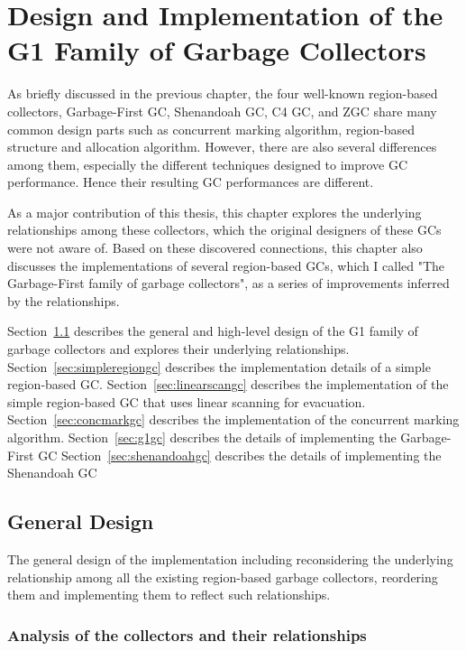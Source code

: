 \chapter{Design and Implementation of the G1 Family of Garbage Collectors}
\label{cha:implementation}

As briefly discussed in the previous chapter, the four well-known region-based collectors, Garbage-First GC, Shenandoah GC, C4 GC, and
ZGC share many common design parts such as concurrent marking algorithm, region-based
structure and allocation algorithm. However, there are also several differences
among them, especially the different techniques designed to improve GC performance.
Hence their resulting GC performances are different.

As a major contribution of this thesis, this chapter explores the underlying relationships
among these collectors, which the original designers of these GCs were not aware of.
Based on these discovered connections, this chapter also discusses the implementations
of several region-based GCs, which I called "The Garbage-First family of garbage collectors",
as a series of improvements inferred by the relationships.

Section~\ref{sec:generaldesign} describes the general and high-level design of the
G1 family of garbage collectors and explores their underlying relationships.
Section~\ref{sec:simpleregiongc} describes the implementation details of a simple region-based GC.
Section~\ref{sec:linearscangc} describes the implementation of the simple region-based GC that uses linear scanning for evacuation.
Section~\ref{sec:concmarkgc} describes the implementation of the concurrent marking algorithm.
Section~\ref{sec:g1gc} describes the details of implementing the Garbage-First GC
Section~\ref{sec:shenandoahgc} describes the details of implementing the Shenandoah GC



\section{General Design}
\label{sec:generaldesign}

The general design of the implementation including reconsidering the underlying
relationship among all the existing region-based garbage collectors, reordering them
and implementing them to reflect such relationships.

\subsection{Analysis of the collectors and their relationships}

